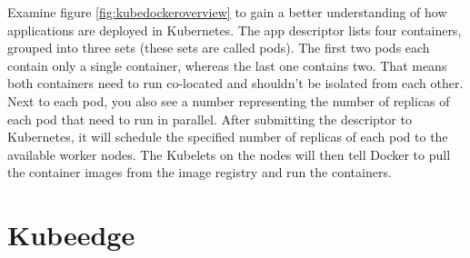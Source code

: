 Examine figure \ref{fig:kubedockeroverview} to gain a better understanding of how applications are deployed in Kubernetes. The app descriptor lists four containers, grouped into three sets (these sets are called pods). The first two pods each contain only a single container, whereas the last one contains two. That means both containers need to run co-located and shouldn't be isolated from each other. Next to each pod, you also see a number representing the number of replicas of each pod that need to run in parallel. After submitting the descriptor to Kubernetes, it will schedule the specified number of replicas of each pod to the available worker nodes. The Kubelets on the nodes will then tell Docker to pull the container images from the image registry and run the containers.






\section{Kubeedge} \label{kubeedgebackground} %
\clearpage
\thispagestyle{empty}